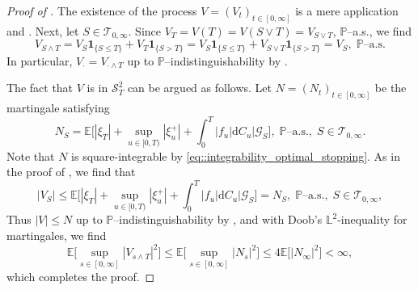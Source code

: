 \documentclass[10pt]{article} %
\newcommand\cG{\mathcal G}
\newcommand\cS{\mathcal S}
\newcommand\cT{\mathcal T}
\def \E{\mathbb{E}}
\def \L{\mathbb{L}}
\def \P{\mathbb{P}}
\newcommand{\1}{\mathbf{1}}
\def\d{\mathrm{d}}
\begin{document}
\begin{proof}[Proof of ]
	The existence of the process $V = (V_t)_{t \in [0,\infty]}$ is a mere application  and \cite[Appendix I, Remark 23(b)]{dellacherie1982probabilities}. Next, let $S \in \cT_{0,\infty}$. Since $V_{T} = V(T) = V(S \lor T) = V_{S \lor T}$, $\P$--a.s., we find
	\begin{equation*}
		V_{S \land T} = V_S \mathbf{1}_{\{S \leq T\}} + V_T \mathbf{1}_{\{S > T\}} = V_S\mathbf{1}_{\{S \leq T\}} + V_{S \lor T}\mathbf{1}_{\{S > T\}} = V_S, \; \text{$\P$--a.s.}
	\end{equation*}
	In particular, $V_\cdot = V_{\cdot \land T}$ up to $\P$--indistinguishability by .
	
	\medskip
	The fact that $V$ is in $\cS^2_T$ can be argued as follows. Let $N = (N_t)_{t \in [0,\infty]}$ be the martingale satisfying
	\begin{equation*}
		N_S = \E\Bigg[|\xi_T| + \sup_{u \in [0,T)}|\xi^+_u| + \int_0^T|f_u|\d C_u \bigg| \cG_S\bigg], \; \text{$\P$--a.s.}, \; S \in \cT_{0,\infty}.
	\end{equation*} 
	Note that $N$ is square-integrable by \eqref{eq::integrability_optimal_stopping}. As in the proof of , we find that
	\begin{equation*}
		|V_S| \leq \E\Bigg[|\xi_T| + \sup_{u \in [0,T)}|\xi^+_u| + \int_0^T|f_u|\d C_u \bigg| \cG_S\bigg] = N_S,\; \text{$\P$--a.s.}, \; S \in \cT_{0,\infty},
	\end{equation*}
	Thus $|V| \leq N$ up to $\P$--indistinguishability by , and with Doob's $\L^2$-inequality for martingales, we find
	\begin{equation*}
		\E\bigg[\sup_{s \in [0,\infty]} |V_{s \land T}|^2\bigg] \leq \E\bigg[\sup_{s \in [0,\infty]} |N_s|^2\bigg] \leq 4 \E\big[|N_\infty|^2\big] < \infty,
	\end{equation*}
	which completes the proof.
\end{proof}
\end{document}

